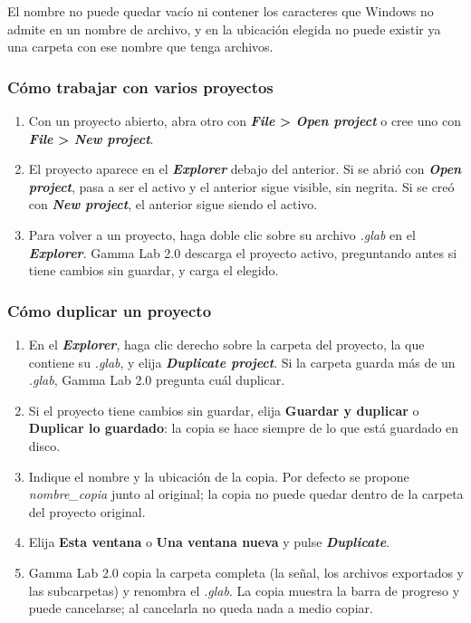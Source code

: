 \documentclass[11pt,a4paper]{article}
\begin{document}
    El nombre no puede quedar vac\'io ni contener los caracteres que Windows no admite en un nombre de archivo, y en la ubicaci\'on elegida no puede existir ya una carpeta con ese nombre que tenga archivos.

    \subsubsection*{C\'omo trabajar con varios proyectos}
    \begin{enumerate}
        \item Con un proyecto abierto, abra otro con \textbf{\textit{File} > \textit{Open project}} o cree uno con \textbf{\textit{File} > \textit{New project}}.
        \item El proyecto aparece en el \textbf{\textit{Explorer}} debajo del anterior. Si se abri\'o con \textbf{\textit{Open project}}, pasa a ser el activo y el anterior sigue visible, sin negrita. Si se cre\'o con \textbf{\textit{New project}}, el anterior sigue siendo el activo.
        \item Para volver a un proyecto, haga doble clic sobre su archivo \textit{.glab} en el \textbf{\textit{Explorer}}. Gamma Lab 2.0 descarga el proyecto activo, preguntando antes si tiene cambios sin guardar, y carga el elegido.
    \end{enumerate}

    \subsubsection*{C\'omo duplicar un proyecto}
    \begin{enumerate}
        \item En el \textbf{\textit{Explorer}}, haga clic derecho sobre la carpeta del proyecto, la que contiene su \textit{.glab}, y elija \textbf{\textit{Duplicate project}}. Si la carpeta guarda m\'as de un \textit{.glab}, Gamma Lab 2.0 pregunta cu\'al duplicar.
        \item Si el proyecto tiene cambios sin guardar, elija \textbf{Guardar y duplicar} o \textbf{Duplicar lo guardado}: la copia se hace siempre de lo que est\'a guardado en disco.
        \item Indique el nombre y la ubicaci\'on de la copia. Por defecto se propone \textit{nombre\_copia} junto al original; la copia no puede quedar dentro de la carpeta del proyecto original.
        \item Elija \textbf{Esta ventana} o \textbf{Una ventana nueva} y pulse \textbf{\textit{Duplicate}}.
        \item Gamma Lab 2.0 copia la carpeta completa (la se\~nal, los archivos exportados y las subcarpetas) y renombra el \textit{.glab}. La copia muestra la barra de progreso y puede cancelarse; al cancelarla no queda nada a medio copiar.
    \end{enumerate}
\end{document}
